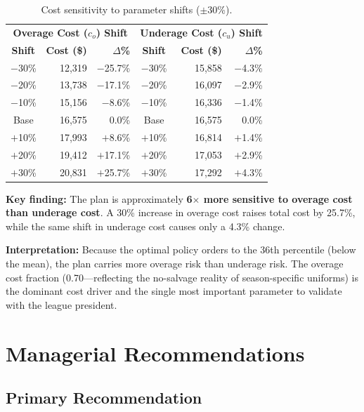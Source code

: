 \documentclass[11pt, letterpaper]{article}
\begin{document}
\begin{table}[H]
\centering
\caption{Cost sensitivity to parameter shifts ($\pm$30\%).}
\label{tab:sensitivity}
\begin{tabular}{@{}crr|crr@{}}
\toprule
\multicolumn{3}{c|}{\textbf{Overage Cost ($c_o$) Shift}} & \multicolumn{3}{c}{\textbf{Underage Cost ($c_u$) Shift}} \\
\textbf{Shift} & \textbf{Cost (\$)} & \textbf{$\Delta$\%} & \textbf{Shift} & \textbf{Cost (\$)} & \textbf{$\Delta$\%} \\
\midrule
$-$30\% & 12,319 & $-$25.7\% & $-$30\% & 15,858 & $-$4.3\% \\
$-$20\% & 13,738 & $-$17.1\% & $-$20\% & 16,097 & $-$2.9\% \\
$-$10\% & 15,156 & $-$8.6\% & $-$10\% & 16,336 & $-$1.4\% \\
Base    & 16,575 & 0.0\%     & Base    & 16,575 & 0.0\% \\
$+$10\% & 17,993 & $+$8.6\% & $+$10\% & 16,814 & $+$1.4\% \\
$+$20\% & 19,412 & $+$17.1\% & $+$20\% & 17,053 & $+$2.9\% \\
$+$30\% & 20,831 & $+$25.7\% & $+$30\% & 17,292 & $+$4.3\% \\
\bottomrule
\end{tabular}
\end{table}

\textbf{Key finding:} The plan is approximately \textbf{6$\times$ more sensitive to overage cost than underage cost}. A 30\% increase in overage cost raises total cost by 25.7\%, while the same shift in underage cost causes only a 4.3\% change.

\textbf{Interpretation:} Because the optimal policy orders to the 36th percentile (below the mean), the plan carries more overage risk than underage risk. The overage cost fraction (0.70---reflecting the no-salvage reality of season-specific uniforms) is the dominant cost driver and the single most important parameter to validate with the league president.

\section{Managerial Recommendations}

\subsection{Primary Recommendation}
\end{document}
